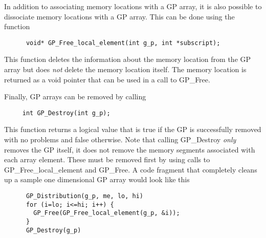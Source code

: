 In addition to associating memory locations with a GP array, it is also possible
to dissociate memory locations with a GP array. This can be done using the
function

\begin{verbatim}
      void* GP_Free_local_element(int g_p, int *subscript);
\end{verbatim}

\noindent
This function deletes the information about the memory location from the GP
array but does \emph{not} delete the memory location itself. The memory location
is returned as a void pointer that can be used in a call to GP\_Free.

Finally, GP arrays can be removed by calling

\begin{verbatim}
     int GP_Destroy(int g_p);
\end{verbatim}

\noindent
This function returns a logical value that is true if the GP is successfully
removed with no problems and false otherwise. Note that calling GP\_Destroy
\emph{only} removes the GP itself, it does not remove the memory segments
associated with each array element. These must be removed first by using calls to
GP\_Free\_local\_element and GP\_Free. A code fragment that completely cleans up
a sample one dimensional GP array would look like this

\begin{verbatim}
      GP_Distribution(g_p, me, lo, hi)
      for (i=lo; i<=hi; i++) {
        GP_Free(GP_Free_local_element(g_p, &i));
      }
      GP_Destroy(g_p)
\end{verbatim}
